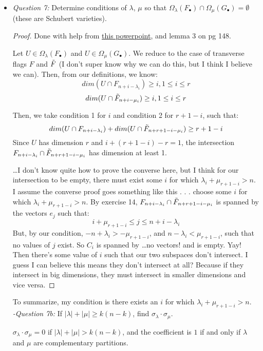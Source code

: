 \begin{itemize}
\begin{enumerate}[a)]
        
    \end{enumerate}
    \item \textit{Question 7: } Determine conditions of $\lambda$, $\mu$ so that $\Omega_\lambda(F_\bullet) \cap \Omega_\mu(G_\bullet) = \emptyset$ (these are Schubert varieties).
    \begin{proof}
        Done with help from \href{https://quangvdao.github.io/schubert-calculus-minicourse/day2.pdf}{this powerpoint}, and lemma 3 on pg 148. 

        Let $U \in \Omega_\lambda(F_\bullet)$ and $U \in \Omega_\mu(G_\bullet)$. We reduce to the case of transverse flags $F$ and $\Tilde{F}$ (I don't super know why we can do this, but I think I believe we can). Then, from our definitions, we know:
        \begin{equation*}
            dim(U\cap F_{n+i-\lambda_i}) \geq i, 1 \leq i \leq r
        \end{equation*}
        \begin{equation*}
            dim(U\cap \Tilde{F}_{n+i-\mu_i}) \geq i, 1 \leq i \leq r
        \end{equation*}

        Then, we take condition 1 for $i$ and condition 2 for $r+1 - i$, such that:
        \begin{equation*}
            dim(U\cap F_{n+i-\lambda_i}) + dim(U\cap \Tilde{F}_{n+r+1-i-\mu_i}) \geq r+1-i
        \end{equation*}
        Since $U$ has dimension $r$ and $i + (r+1-i) - r = 1$, the intersection $F_{n+i-\lambda_i} \cap \Tilde{F}_{n+r+1-i-\mu_i}$ has dimension at least 1. 
        
        \ldots I don't know quite how to prove the converse here, but I think for our intersection to be empty, there must exist some $i$ for which $\lambda_i + \mu_{r+1-i} > n$.  I assume the converse proof goes something like this . . . choose some $i$ for which $\lambda_i + \mu_{r+1-i}>n$. By exercise 14, $F_{n+i-\lambda_i} \cap \Tilde{F}_{n+r+1-i-\mu_i}$ is spanned by the vectors $e_j$ such that:
        \begin{equation*}
            i + \mu_{r+1 - i} \leq j \leq n+i-\lambda_i
        \end{equation*}
        But, by our condition, $-n + \lambda_i > -\mu_{r+1-i}$, and $n - \lambda_i < \mu_{r+1-i}$, such that no values of $j$ exist. So $C_i$ is spanned by \ldots no vectors! and is empty. Yay! Then there's some value of $i$ such that our two subspaces don't intersect. I guess I can believe this means they don't intersect at all? Because if they intersect in big dimensions, they must intersect in smaller dimensions and vice versa.
    \end{proof}
        To summarize, my condition is there exists an $i$ for which $\lambda_i + \mu_{r+1-i} > n$. \\

    \textit{-Question 7b: }If $|\lambda| + |\mu| \geq k(n-k)$, find $\sigma_\lambda \cdot \sigma_\mu$.

    $\sigma_\lambda \cdot \sigma_\mu = 0$ if $|\lambda| + |\mu| > k(n-k)$, and the coefficient is $1$ if and only if $\lambda$ and $\mu$ are complementary partitions.
\end{itemize}